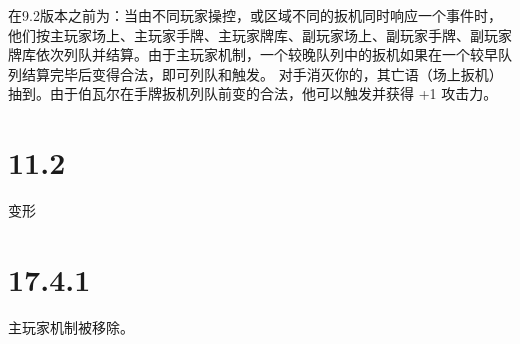 在9.2版本之前为：当由不同玩家操控，或区域不同的扳机同时响应一个事件时，他们按主玩家场上、主玩家手牌、主玩家牌库、副玩家场上、副玩家手牌、副玩家牌库依次列队并结算。由于主玩家机制，一个较晚队列中的扳机如果在一个较早队列结算完毕后变得合法，即可列队和触发。
\example 对手消灭你的，其亡语（场上扳机）抽到。由于伯瓦尔在手牌扳机列队前变的合法，他可以触发并获得 +1 攻击力。

\section{11.2}
\label{rule-update:11.2}

变形

\section{17.4.1}
\label{rule-update:17.4.1}

主玩家机制被移除。